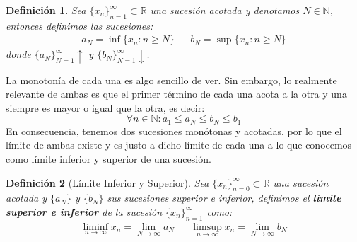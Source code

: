 \documentclass[10pt,a4paper,openright]{book}
\theoremstyle{break}
\newtheorem{defi}{Definición}[chapter]
\begin{document}
\begin{defi}
Sea $\{x_n\}_{n=1}^\infty\subset \mathbb R$ una sucesión acotada y denotamos $N\in \mathbb N$, entonces definimos las sucesiones:
\begin{align*}
a_N=\inf\{x_n: n\geq N\} & & b_N=\sup\{x_n: n\geq N\}
\end{align*}
donde $\{a_N\}_{N=1}^\infty \uparrow$ y $\{b_N\}_{N=1}^\infty \downarrow$.
\end{defi}

La monotonía de cada una es algo sencillo de ver. Sin embargo, lo realmente relevante de ambas es que el primer término de cada una acota a la otra y una siempre es mayor o igual que la otra, es decir:
\[
\forall n\in \mathbb N: a_1\leq a_N\leq b_N\leq b_1
\]
En consecuencia, tenemos dos sucesiones monótonas y acotadas, por lo que el límite de ambas existe y es justo a dicho límite de cada una a lo que conocemos como límite inferior y superior de una sucesión.

\begin{defi}[Límite Inferior y Superior]
Sea $\{x_n\}_{n=0}^\infty\subset \mathbb R$ una sucesión acotada y $\{a_N\}$ y $\{b_N\}$ sus sucesiones superior e inferior, definimos el \textbf{límite superior e inferior} de la sucesión $\{x_n\}_{n=1}^\infty$ como:
\begin{align*}
	\liminf_{n\rightarrow\infty}x_n=\lim_{N\rightarrow\infty}a_N
	&&
	\limsup_{n\rightarrow\infty}x_n=\lim_{N\rightarrow\infty}b_N
\end{align*}
\end{defi}
\end{document}
